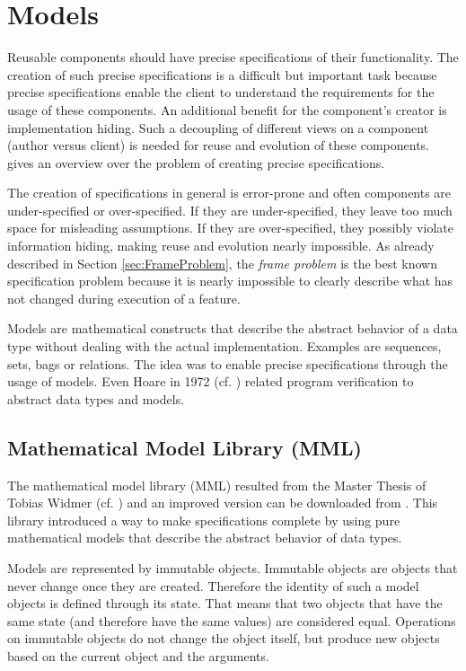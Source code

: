 \chapter{Models}
\label{sec:Models}

Reusable components should have precise specifications of their functionality. The creation of such precise specifications is a difficult but important task because precise specifications enable the client to understand the requirements for the usage of these components. An additional benefit for the component's creator is implementation hiding. Such a decoupling of different views on a component (author versus client) is needed for reuse and evolution of these components. \cite{Schoeller03Strengthening} gives an overview over the problem of creating precise specifications.

The creation of specifications in general is error-prone and often components are under-specified or over-specified. If they are under-specified, they leave too much space for misleading assumptions. If they are over-specified, they possibly violate information hiding, making reuse and evolution nearly impossible. As already described in Section \ref{sec:FrameProblem}, the \emph{frame problem} is the best known specification problem because it is nearly impossible to clearly describe what has not changed during execution of a feature.

Models are mathematical constructs that describe the abstract behavior of a data type without dealing with the actual implementation. Examples are sequences, sets, bags or relations. The idea was to enable precise specifications through the usage of models. Even Hoare in 1972 (cf. \cite{Hoare72Proof}) related program verification to abstract data types and models.

\section{Mathematical Model Library (MML)}
\label{sec:MML}

The mathematical model library (MML) resulted from the Master Thesis of Tobias Widmer (cf. \cite{Widmer04Reusable}) and an improved version can be downloaded from \cite{MML}. This library introduced a way to make specifications complete by using pure mathematical models that describe the abstract behavior of data types.

Models are represented by immutable objects. Immutable objects are objects that never change once they are created. Therefore the identity of such a model objects is defined through its state. That means that two objects that have the same state (and therefore have the same values) are considered equal. Operations on immutable objects do not change the object itself, but produce new objects based on the current object and the arguments.

